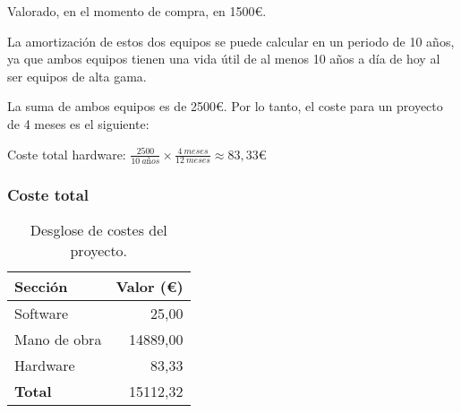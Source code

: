 Valorado, en el momento de compra, en 1500€.

La amortización de estos dos equipos se puede calcular en un periodo de 10 años, ya que ambos equipos tienen una vida útil de al menos 10 años a día de hoy al ser equipos de alta gama.

La suma de ambos equipos es de 2500€. Por lo tanto, el coste para un proyecto de 4 meses es el siguiente:
\begin{center}
    Coste total hardware: \(\frac{2500}{10~años} \times \frac{4~meses}{12~meses} \approx 83,33\)€
\end{center}

\subsubsection{Coste total}
\begin{table}[h]
    \centering
        \begin{tabular}{|l|r|}
        \hline
        \textbf{Sección} & \textbf{Valor (€)} \\
        \hline
        Software & 25,00 \\
        Mano de obra & 14889,00 \\
        Hardware & 83,33 \\
        \hline
        \textbf{Total} & 15112,32 \\
        \hline
        \end{tabular}
    \caption{Desglose de costes del proyecto.}
    \label{tab:costes}
\end{table}